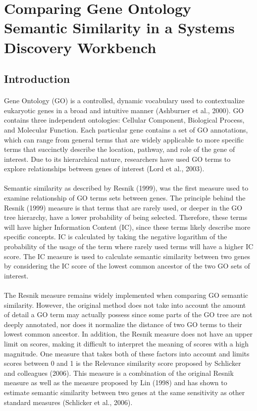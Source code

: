 \documentclass{article}
\begin{document}

\section{Comparing Gene Ontology Semantic Similarity in a Systems Discovery Workbench}

\subsection{Introduction}
\paragraph{}
Gene Ontology (GO) is a controlled, dynamic vocabulary used to contextualize eukaryotic genes in a broad and intuitive manner (Ashburner et al., 2000). GO contains three independent ontologies: Cellular Component, Biological Process, and Molecular Function. Each particular gene contains a set of GO annotations, which can range from general terms that are widely applicable to more specific terms that succinctly describe the location, pathway, and role of the gene of interest. Due to its hierarchical nature, researchers have used GO terms to explore relationships between genes of interest (Lord et al., 2003).
\paragraph{}
Semantic similarity as described by Resnik (1999), was the first measure used to examine relationship of GO terms sets between genes. The principle behind the Resnik (1999) measure is that terms that are rarely used, or deeper in the GO tree hierarchy, have a lower probability of being selected. Therefore, these terms will have higher Information Content (IC), since these terms likely describe more specific concepts. IC is calculated by taking the negative logarithm of the probability of the usage of the term where rarely used terms will have a higher IC score. The IC measure is used to calculate semantic similarity between two genes by considering the IC score of the lowest common ancestor of the two GO sets of interest.
\paragraph{}
The Resnik measure remains widely implemented when comparing GO semantic similarity. However, the original method does not take into account the amount of detail a GO term may actually possess since some parts of the GO tree are not deeply annotated, nor does it normalize the distance of two GO terms to their lowest common ancestor. In addition, the Resnik measure does not have an upper limit on scores, making it difficult to interpret the meaning of scores with a high magnitude. One measure that takes both of these factors into account and limits scores between 0 and 1 is the Relevance similarity score proposed by Schlicker and colleagues (2006). This measure is a combination of the original Resnik measure as well as the measure proposed by Lin (1998) and has shown to estimate semantic similarity between two genes at the same sensitivity as other standard measures (Schlicker et al., 2006).
\end{document}
